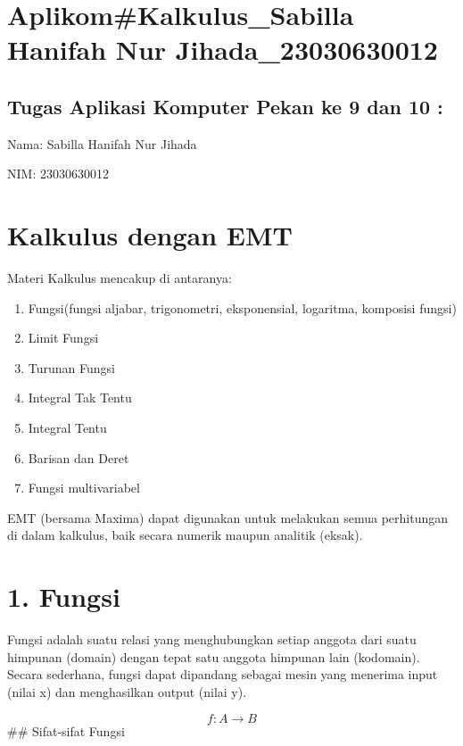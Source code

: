 \documentclass[
]{book}
\author{}
\date{}
\begin{document}
\frontmatter

\mainmatter
\chapter{Aplikom\#Kalkulus\_Sabilla Hanifah Nur Jihada\_23030630012}\label{aplikomkalkulus_sabilla-hanifah-nur-jihada_23030630012}

\section{Tugas Aplikasi Komputer Pekan ke 9 dan 10 :}\label{tugas-aplikasi-komputer-pekan-ke-9-dan-10}

Nama: Sabilla Hanifah Nur Jihada

NIM: 23030630012

\chapter{Kalkulus dengan EMT}\label{kalkulus-dengan-emt}

Materi Kalkulus mencakup di antaranya:

\begin{enumerate}
\def\labelenumi{\arabic{enumi}.}
\item
  Fungsi(fungsi aljabar, trigonometri, eksponensial, logaritma, komposisi fungsi)
\item
  Limit Fungsi
\item
  Turunan Fungsi
\item
  Integral Tak Tentu
\item
  Integral Tentu
\item
  Barisan dan Deret
\item
  Fungsi multivariabel
\end{enumerate}

EMT (bersama Maxima) dapat digunakan untuk melakukan semua perhitungan di dalam kalkulus, baik secara numerik maupun analitik (eksak).

\chapter{1. Fungsi}\label{fungsi}

Fungsi adalah suatu relasi yang menghubungkan setiap anggota dari suatu himpunan (domain) dengan tepat satu anggota himpunan lain (kodomain). Secara sederhana, fungsi dapat dipandang sebagai mesin yang menerima input (nilai x) dan menghasilkan output (nilai y).

\[f: A \to B\]\#\# Sifat-sifat Fungsi
\end{document}
